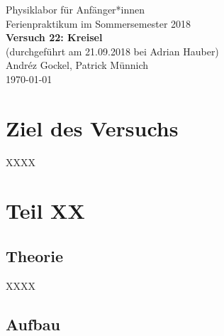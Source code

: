 \documentclass[11pt,a4paper]{article}
\begin{document}
{
\centering 
\large 
Physiklabor für Anf\"anger*innen \\
Ferienpraktikum im Sommersemester 2018 \\[4mm]
\textbf{\LARGE 
Versuch 22: Kreisel
} \\[3mm]
(durchgef\"uhrt am 21.09.2018 bei Adrian Hauber) \\
Andréz Gockel, Patrick M\"unnich\\
\today \\[10mm]
}

\vspace{50pt}
\tableofcontents
\vspace{22pt}
\listoftables
\vspace{22pt}
\listoffigures
\pagebreak

\section{Ziel des Versuchs}
XXXX

\section{Teil XX}

\subsection{Theorie}

XXXX

\subsection{Aufbau}
\end{document}
